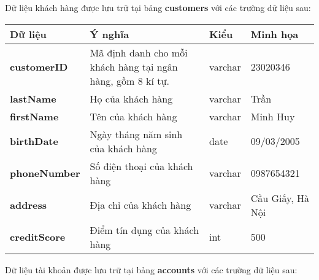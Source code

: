


Dữ liệu khách hàng được lưu trữ tại bảng \textbf{customers} với các trường dữ liệu sau:

\renewcommand{\arraystretch}{2} %
\setlength{\tabcolsep}{10pt}

\begin{center}
    \begin{tabular}{ | m{9em} | m{15em}| m{5em} | m{5em} | } 
    \hline
    \rowcolor{gray!30}
    Dữ liệu & Ý nghĩa & Kiểu & Minh họa \\ 

    \hline
    \textbf{customerID} &
    Mã định danh cho mỗi khách hàng tại ngân hàng, gồm 8 kí tự. &
    varchar &
    23020346 \\

    \hline
    \textbf{lastName} &
    Họ của khách hàng &
    varchar &
    Trần \\

    \hline
    \textbf{firstName} &
    Tên của khách hàng &
    varchar &
    Minh Huy \\

    \hline
    \textbf{birthDate} &
    Ngày tháng năm sinh của khách hàng &
    date &
    09/03/2005\\

    \hline
    \textbf{phoneNumber} &
    Số điện thoại của khách hàng &
    varchar &
    0987654321 \\

    \hline
    \textbf{address} &
    Địa chỉ của khách hàng &
    varchar &
    Cầu Giấy, Hà Nội \\

    \hline
    \textbf{creditScore} &
    Điểm tín dụng của khách hàng &
    int &
    500 \\

    \hline
    \end{tabular}
\end{center}

\newpage
\noindent
Dữ liệu tài khoản được lưu trữ tại bảng \textbf{accounts} với các trường dữ liệu sau:

